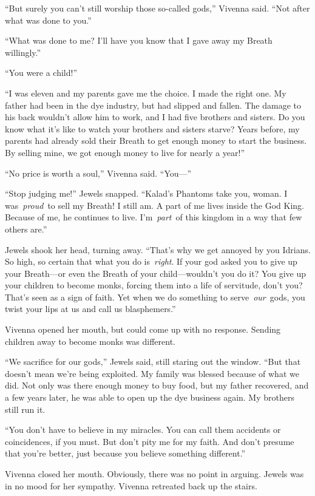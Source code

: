 “But surely you can’t still worship those so-called gods,” Vivenna said. “Not after what was done to you.”

“What was done to me? I’ll have you know that I gave away my Breath willingly.”

“You were a child!”

“I was eleven and my parents gave me the choice. I made the right one. My father had been in the dye industry, but had slipped and fallen. The damage to his back wouldn’t allow him to work, and I had five brothers and sisters. Do you know what it’s like to watch your brothers and sisters starve? Years before, my parents had already sold their Breath to get enough money to start the business. By selling mine, we got enough money to live for nearly a year!”

“No price is worth a soul,” Vivenna said. “You—”

“Stop judging me!” Jewels snapped. “Kalad’s Phantoms take you, woman. I was~\textit{proud}~to sell my Breath! I still am. A part of me lives inside the God King. Because of me, he continues to live. I’m~\textit{part}~of this kingdom in a way that few others are.”

Jewels shook her head, turning away. “That’s why we get annoyed by you Idrians. So high, so certain that what you do is~\textit{right}. If your god asked you to give up your Breath—or even the Breath of your child—wouldn’t you do it? You give up your children to become monks, forcing them into a life of servitude, don’t you? That’s seen as a sign of faith. Yet when we do something to serve~\textit{our}~gods, you twist your lips at us and call us blasphemers.”

Vivenna opened her mouth, but could come up with no response. Sending children away to become monks was different.

“We sacrifice for our gods,” Jewels said, still staring out the window. “But that doesn’t mean we’re being exploited. My family was blessed because of what we did. Not only was there enough money to buy food, but my father recovered, and a few years later, he was able to open up the dye business again. My brothers still run it.

“You don’t have to believe in my miracles. You can call them accidents or coincidences, if you must. But don’t pity me for my faith. And don’t presume that you’re better, just because you believe something different.”

Vivenna closed her mouth. Obviously, there was no point in arguing. Jewels was in no mood for her sympathy. Vivenna retreated back up the stairs.

